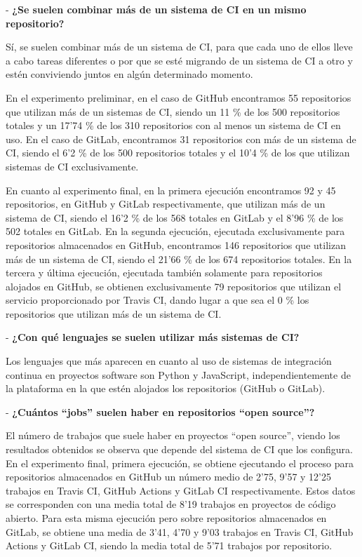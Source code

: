 - \textbf{¿Se suelen combinar más de un sistema de CI en un mismo repositorio?}

Sí, se suelen combinar más de un sistema de CI, para que cada uno de ellos lleve a cabo tareas diferentes o por que se esté migrando de un sistema de CI a otro y estén conviviendo juntos en algún determinado momento.

En el experimento preliminar, en el caso de GitHub encontramos 55 repositorios que utilizan más de un sistemas de CI, siendo un 11 \% de los 500 repositorios totales y un 17'74 \% de los 310 repositorios con al menos un sistema de CI en uso. En el caso de GitLab, encontramos 31 repositorios con más de un sistema de CI, siendo el 6'2 \% de los 500 repositorios totales y el 10'4 \% de los que utilizan sistemas de CI exclusivamente.

En cuanto al experimento final, en la primera ejecución encontramos 92 y 45 repositorios, en GitHub y GitLab respectivamente, que utilizan más de un sistema de CI, siendo el 16'2 \% de los 568 totales en GitLab y el 8'96 \% de los 502 totales en GitLab. En la segunda ejecución, ejecutada exclusivamente para repositorios almacenados en GitHub, encontramos 146 repositorios que utilizan más de un sistema de CI, siendo el 21'66 \% de los 674 repositorios totales. En la tercera y última ejecución, ejecutada también solamente para repositorios alojados en GitHub, se obtienen exclusivamente 79 repositorios que utilizan el servicio proporcionado por Travis CI, dando lugar a que sea el 0 \% los repositorios que utilizan más de un sistema de CI.

- \textbf{¿Con qué lenguajes se suelen utilizar más sistemas de CI?}

Los lenguajes que más aparecen en cuanto al uso de sistemas de integración continua en proyectos software son Python y JavaScript, independientemente de la plataforma en la que estén alojados los repositorios (GitHub o GitLab).

- \textbf{¿Cuántos ``jobs'' suelen haber en repositorios ``open source''?}

El número de trabajos que suele haber en proyectos ``open source'', viendo los resultados obtenidos se observa que depende del sistema de CI que los configura. En el experimento final, primera ejecución, se obtiene ejecutando el proceso para repositorios almacenados en GitHub un número medio de 2'75, 9'57 y 12'25 trabajos en Travis CI, GitHub Actions y GitLab CI respectivamente. Estos datos se corresponden con una media total de 8'19 trabajos en proyectos de código abierto. Para esta misma ejecución pero sobre repositorios almacenados en GitLab, se obtiene una media de 3'41, 4'70 y 9'03 trabajos en Travis CI, GitHub Actions y GitLab CI, siendo la media total de 5'71 trabajos por repositorio.

